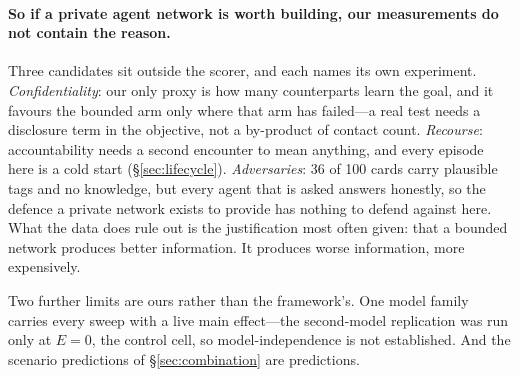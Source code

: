 \paragraph{So if a private agent network is worth building, our measurements do not contain
the reason.} Three candidates sit outside the scorer, and each names its own experiment.
\emph{Confidentiality}: our only proxy is how many counterparts learn the goal, and it
favours the bounded arm only where that arm has failed---a real test needs a disclosure term
in the objective, not a by-product of contact count. \emph{Recourse}: accountability needs a
second encounter to mean anything, and every episode here is a cold start
(\S\ref{sec:lifecycle}). \emph{Adversaries}: 36 of 100 cards carry plausible tags and no
knowledge, but every agent that is asked answers honestly, so the defence a private network
exists to provide has nothing to defend against here. What the data does rule out is the
justification most often given: that a bounded network produces better information. It
produces worse information, more expensively.

Two further limits are ours rather than the framework's. One model family carries every
sweep with a live main effect---the second-model replication was run only at $E=0$, the
control cell, so model-independence is not established. And the scenario predictions of
\S\ref{sec:combination} are predictions.
\fi
